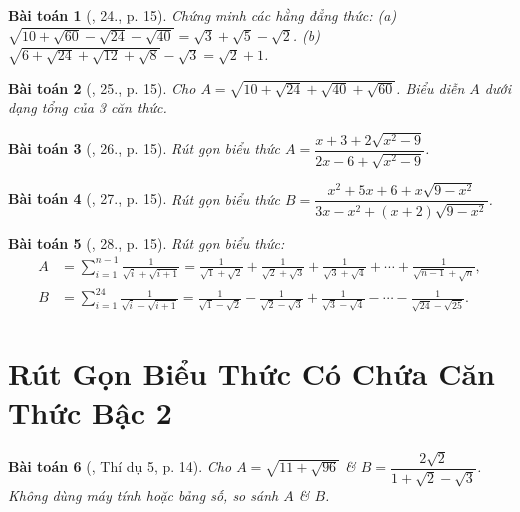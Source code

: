 \documentclass{article}
\newtheorem{baitoan}{Bài toán}
\begin{document}
\begin{baitoan}[\cite{Binh_Toan_9_tap_1}, 24., p. 15]
	Chứng minh các hằng đẳng thức: (a) $\sqrt{10 + \sqrt{60} - \sqrt{24} - \sqrt{40}} = \sqrt{3} + \sqrt{5} - \sqrt{2}$. (b) $\sqrt{6 + \sqrt{24} + \sqrt{12} + \sqrt{8}} - \sqrt{3} = \sqrt{2} + 1$.
\end{baitoan}

\begin{baitoan}[\cite{Binh_Toan_9_tap_1}, 25., p. 15]
	Cho $A = \sqrt{10 + \sqrt{24} + \sqrt{40} + \sqrt{60}}$. Biểu diễn $A$ dưới dạng tổng của 3 căn thức.
\end{baitoan}

\begin{baitoan}[\cite{Binh_Toan_9_tap_1}, 26., p. 15]
	Rút gọn biểu thức $A = \dfrac{x + 3 + 2\sqrt{x^2 - 9}}{2x - 6 + \sqrt{x^2 - 9}}$.
\end{baitoan}

\begin{baitoan}[\cite{Binh_Toan_9_tap_1}, 27., p. 15]
	Rút gọn biểu thức $B = \dfrac{x^2 + 5x + 6 + x\sqrt{9 - x^2}}{3x - x^2 + (x + 2)\sqrt{9 - x^2}}$.
\end{baitoan}

\begin{baitoan}[\cite{Binh_Toan_9_tap_1}, 28., p. 15]
	Rút gọn biểu thức:
	\begin{align*}
		A &= \sum_{i=1}^{n-1} \frac{1}{\sqrt{i} + \sqrt{i + 1}} = \frac{1}{\sqrt{1} + \sqrt{2}} + \frac{1}{\sqrt{2} + \sqrt{3}} + \frac{1}{\sqrt{3} + \sqrt{4}} + \cdots + \frac{1}{\sqrt{n - 1} + \sqrt{n}},\\
		B &= \sum_{i=1}^{24} \frac{1}{\sqrt{i} - \sqrt{i + 1}} = \frac{1}{\sqrt{1} - \sqrt{2}} - \frac{1}{\sqrt{2} - \sqrt{3}} + \frac{1}{\sqrt{3} - \sqrt{4}} - \cdots - \frac{1}{\sqrt{24} - \sqrt{25}}.
	\end{align*}
\end{baitoan}


\section{Rút Gọn Biểu Thức Có Chứa Căn Thức Bậc 2}

\begin{baitoan}[\cite{Tuyen_Toan_9}, Thí dụ 5, p. 14]
	Cho $A = \sqrt{11 + \sqrt{96}}$ \& $B = \dfrac{2\sqrt{2}}{1 + \sqrt{2} - \sqrt{3}}$. Không dùng máy tính hoặc bảng số, so sánh $A$ \& $B$.
\end{baitoan}
\end{document}
